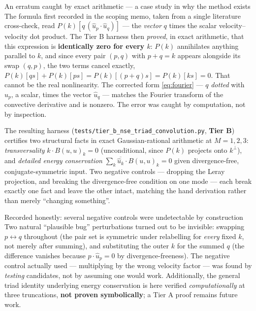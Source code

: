 \documentclass[11pt,a4paper]{article}
\newcommand{\tB}{\textcolor{TierB}{\textbf{Tier B}}}
\theoremstyle{definition}
\theoremstyle{plain}
\begin{document}
\begin{keybox}{An erratum caught by exact arithmetic --- a case study in why the method exists}
The formula first recorded in the scoping memo, taken from a single literature cross-check,
read $P(k)[q\,(\hat u_p\cdot\hat u_q)]$ --- the \emph{vector} $q$ times the scalar
velocity--velocity dot product. The Tier B harness then \emph{proved}, in exact arithmetic,
that this expression is \textbf{identically zero for every $k$}: $P(k)$ annihilates anything
parallel to $k$, and since every pair $(p,q)$ with $p+q=k$ appears alongside its swap
$(q,p)$, the two terms cancel exactly,
$P(k)[q s]+P(k)[p s]=P(k)[(p+q)s]=P(k)[k s]=0$. That cannot be the real nonlinearity. The
corrected form \eqref{eq:fourier} --- $q$ \emph{dotted} with $\hat u_p$, a scalar, times the
vector $\hat u_q$ --- matches the Fourier transform of the convective derivative and is
nonzero. The error was caught by computation, not by inspection.
\end{keybox}

The resulting harness (\texttt{tests/tier\_b\_nse\_triad\_convolution.py}, \tB{}) certifies
two structural facts in exact Gaussian-rational arithmetic at $M=1,2,3$:
\emph{transversality} $k\cdot B(u,u)_k=0$ (unconditional, since $P(k)$ projects onto $k^\perp$),
and \emph{detailed energy conservation} $\sum_k\overline{\hat u_k}\cdot B(u,u)_k=0$ given
divergence-free, conjugate-symmetric input. Two negative controls --- dropping the Leray
projection, and breaking the divergence-free condition on one mode --- each break exactly one
fact and leave the other intact, matching the hand derivation rather than merely
``changing something''.

\begin{keybox}{Recorded honestly: several negative controls were undetectable by construction}
Two natural ``plausible bug'' perturbations turned out to be invisible: swapping $p\leftrightarrow q$
throughout (the pair set is symmetric under relabelling for \emph{every} fixed $k$, not merely
after summing), and substituting the outer $k$ for the summed $q$ (the difference vanishes
because $p\cdot\hat u_p=0$ by divergence-freeness). The negative control actually used ---
multiplying by the wrong velocity factor --- was found by \emph{testing} candidates, not by
assuming one would work. Additionally, the general triad identity underlying energy
conservation is here verified \emph{computationally} at three truncations, \textbf{not proven
symbolically}; a Tier A proof remains future work.
\end{keybox}
\end{document}
